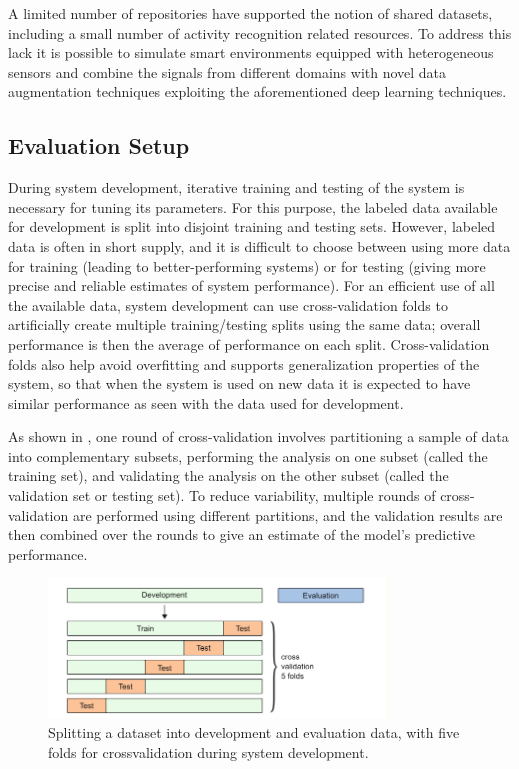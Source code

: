 A limited number of repositories have supported the notion of shared datasets, including a small number of activity recognition related resources. To address this lack it is possible to simulate smart environments equipped with heterogeneous sensors and combine the signals from different domains with novel data augmentation techniques exploiting the aforementioned deep learning techniques.

\subsection{Evaluation Setup}
During system development, iterative training and testing of the system is necessary
for tuning its parameters. For this purpose, the labeled data available for development is split into disjoint training and testing sets. However, labeled data is often in short supply, and it is difficult to choose between using more data for training (leading to better-performing systems) or for testing (giving more precise and
reliable estimates of system performance). For an efficient use of all the available
data, system development can use cross-validation folds to artificially
create multiple training/testing splits using the same data; overall performance is
then the average of performance on each split. Cross-validation folds also help avoid
overfitting and supports generalization properties of the system, so that when the
system is used on new data it is expected to have similar performance as seen with
the data used for development.

As shown in , one round of cross-validation involves partitioning a sample of data into complementary subsets, performing the analysis on one subset (called the training set), and validating the analysis on the other subset (called the validation set or testing set). To reduce variability, multiple rounds of cross-validation are performed using different partitions, and the validation results are then combined over the rounds to give an estimate of the model’s predictive performance. 

\begin{figure}[h]
	\centering
	\includegraphics[width=0.8\textwidth]{img/cross-valid}
	\caption[Cross-validation splitting]{Splitting a dataset into development and evaluation data, with five folds for crossvalidation during system development.}
	\label{fig:cross-valid}
\end{figure}

